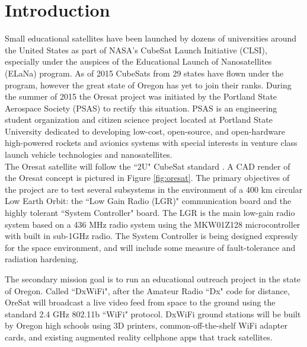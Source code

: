 \documentclass[]{aiaa-tc}%
\begin{document}
\section{Introduction}
Small educational satellites have been launched by dozens of universities around the United States as part of NASA’s CubeSat Launch Initiative (CLSI), especially under the auspices of the Educational Launch of Nanosatellites (ELaNa) program. As of 2015 CubeSats from 29 states have flown under the program, however the great state of Oregon has yet to join their ranks\cite{Mahoney:15bk}. During the summer of 2015 the Oresat project was initiated by the Portland State Aerospace Society (PSAS) to rectify this situation. PSAS is an engineering student organization and citizen science project located at Portland State University dedicated to developing low-cost, open-source, and open-hardware high-powered rockets and avionics systems with special interests in venture class launch vehicle technologies and nanosatellites\cite{PSAS:15bk}.\\

The Oresat satellite will follow the ``2U" CubeSat standard \cite{Cubesat:14bk}. A CAD render of the Oresat concept is pictured in Figure \ref{fig:oresat}. The primary objectives of the project are to test several subsystems in the environment of a 400 km circular Low Earth Orbit: the ``Low Gain Radio (LGR)" communication board and the highly tolerant ``System Controller" board. The LGR is the main low-gain radio system based on a 436 MHz radio system using the MKW01Z128 microcontroller with built in sub-1GHz radio. The System Controller is being designed expressly for the space environment, and will include some measure of fault-tolerance and radiation hardening.

The secondary mission goal is to run an educational outreach project in the state of Oregon. Called ``DxWiFi", after the Amateur Radio ``Dx" code for distance, OreSat will broadcast a live video feed from space to the ground using the standard 2.4 GHz  802.11b ``WiFi" protocol. DxWiFi ground stations will be built by Oregon high schools using 3D printers, common-off-the-shelf WiFi adapter cards, and existing augmented reality cellphone apps that track satellites.
\end{document}
